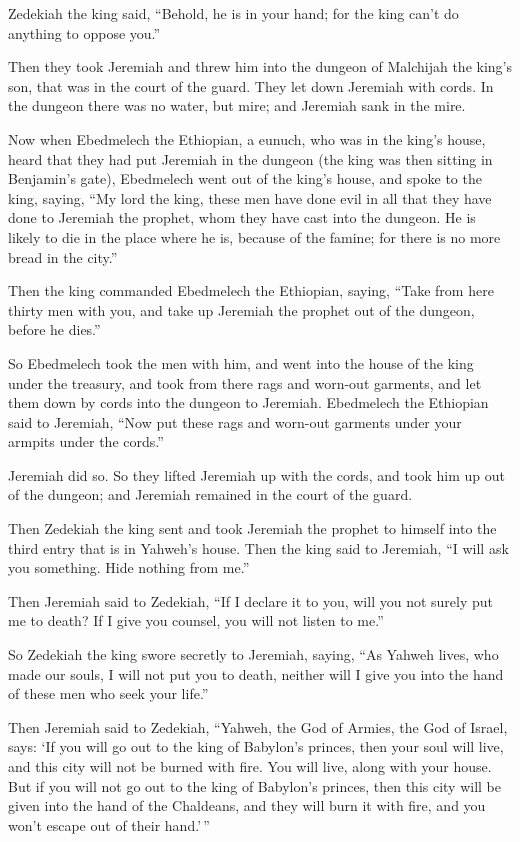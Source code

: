  Zedekiah the king said, ``Behold, he is in your hand; for
the king can't do anything to oppose you.''

 Then they took Jeremiah and threw him into the dungeon of
Malchijah the king's son, that was in the court of the guard. They let
down Jeremiah with cords. In the dungeon there was no water, but mire;
and Jeremiah sank in the mire.

 Now when Ebedmelech the Ethiopian, a eunuch, who was in
the king's house, heard that they had put Jeremiah in the dungeon (the
king was then sitting in Benjamin's gate),  Ebedmelech
went out of the king's house, and spoke to the king, saying,
 ``My lord the king, these men have done evil in all that
they have done to Jeremiah the prophet, whom they have cast into the
dungeon. He is likely to die in the place where he is, because of the
famine; for there is no more bread in the city.''

 Then the king commanded Ebedmelech the Ethiopian,
saying, ``Take from here thirty men with you, and take up Jeremiah the
prophet out of the dungeon, before he dies.''

 So Ebedmelech took the men with him, and went into the
house of the king under the treasury, and took from there rags and
worn-out garments, and let them down by cords into the dungeon to
Jeremiah.  Ebedmelech the Ethiopian said to Jeremiah,
``Now put these rags and worn-out garments under your armpits under the
cords.''

Jeremiah did so.  So they lifted Jeremiah up with the
cords, and took him up out of the dungeon; and Jeremiah remained in the
court of the guard.

 Then Zedekiah the king sent and took Jeremiah the
prophet to himself into the third entry that is in Yahweh's house. Then
the king said to Jeremiah, ``I will ask you something. Hide nothing from
me.''

 Then Jeremiah said to Zedekiah, ``If I declare it to
you, will you not surely put me to death? If I give you counsel, you
will not listen to me.''

 So Zedekiah the king swore secretly to Jeremiah, saying,
``As Yahweh lives, who made our souls, I will not put you to death,
neither will I give you into the hand of these men who seek your life.''

 Then Jeremiah said to Zedekiah, ``Yahweh, the God of
Armies, the God of Israel, says: `If you will go out to the king of
Babylon's princes, then your soul will live, and this city will not be
burned with fire. You will live, along with your house. 
But if you will not go out to the king of Babylon's princes, then this
city will be given into the hand of the Chaldeans, and they will burn it
with fire, and you won't escape out of their hand.'\,''

